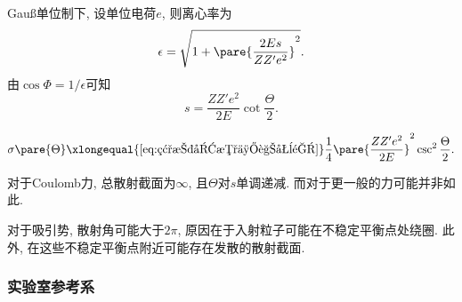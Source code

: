 \documentclass[../TheoreticalMechanics.tex]{subfiles}
\begin{document}
\begin{lemma}[散射角的解析式]
    Gau\ss 单位制下, 设单位电荷$e$, 则离心率为
    \[ \epsilon = \sqrt{1+\pare{\frac{2Es}{ZZ'e^2}}^2}. \]
    由$\cos \Phi = 1/\epsilon$可知
    \[ s = \frac{ZZ'e^2}{2E}\cot\frac{\Theta}{2}. \]
\end{lemma}
\begin{finale}
    \begin{theorem}[散射截面]
        \[ \sigma\pare{\Theta} \xlongequal{\eqref{eq:碰撞参数与角动量}} \frac{1}{4}\pare{\frac{ZZ'e^2}{2E}}^2\csc^2\frac{\Theta}{2}. \]
    \end{theorem}
\end{finale}
\begin{remark}
    对于Coulomb力, 总散射截面为$\infty$, 且$\Theta$对$s$单调递减. 而对于更一般的力可能并非如此.
\end{remark}
\begin{remark}
    对于吸引势, 散射角可能大于$2\pi$, 原因在于入射粒子可能在不稳定平衡点处绕圈. 此外, 在这些不稳定平衡点附近可能存在发散的散射截面.
\end{remark}


\subsubsection{实验室参考系} %
\label{ssub:实验室参考系}
\end{document}
